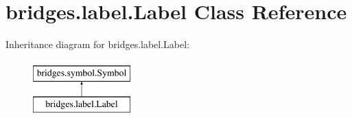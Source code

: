 \hypertarget{classbridges_1_1label_1_1_label}{}\section{bridges.\+label.\+Label Class Reference}
\label{classbridges_1_1label_1_1_label}
Inheritance diagram for bridges.\+label.\+Label\+:\begin{figure}[H]
\begin{center}
\leavevmode
\includegraphics[height=2.000000cm]{classbridges_1_1label_1_1_label}
\end{center}
\end{figure}
